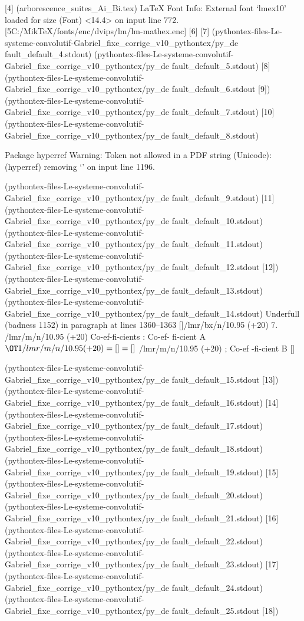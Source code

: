  [4] (arborescence_suites_Ai_Bi.tex)
LaTeX Font Info:    External font `lmex10' loaded for size
(Font)              <14.4> on input line 772.
 [5{C:/MikTeX/fonts/enc/dvips/lm/lm-mathex.enc}] [6] [7]
(pythontex-files-Le-systeme-convolutif-Gabriel_fixe_corrige_v10_pythontex/py_de
fault_default_4.stdout)
(pythontex-files-Le-systeme-convolutif-Gabriel_fixe_corrige_v10_pythontex/py_de
fault_default_5.stdout) [8]
(pythontex-files-Le-systeme-convolutif-Gabriel_fixe_corrige_v10_pythontex/py_de
fault_default_6.stdout [9])
(pythontex-files-Le-systeme-convolutif-Gabriel_fixe_corrige_v10_pythontex/py_de
fault_default_7.stdout) [10]
(pythontex-files-Le-systeme-convolutif-Gabriel_fixe_corrige_v10_pythontex/py_de
fault_default_8.stdout)

Package hyperref Warning: Token not allowed in a PDF string (Unicode):
(hyperref)                removing `\@textsuperscript' on input line 1196.


(pythontex-files-Le-systeme-convolutif-Gabriel_fixe_corrige_v10_pythontex/py_de
fault_default_9.stdout) [11]
(pythontex-files-Le-systeme-convolutif-Gabriel_fixe_corrige_v10_pythontex/py_de
fault_default_10.stdout)
(pythontex-files-Le-systeme-convolutif-Gabriel_fixe_corrige_v10_pythontex/py_de
fault_default_11.stdout)
(pythontex-files-Le-systeme-convolutif-Gabriel_fixe_corrige_v10_pythontex/py_de
fault_default_12.stdout [12])
(pythontex-files-Le-systeme-convolutif-Gabriel_fixe_corrige_v10_pythontex/py_de
fault_default_13.stdout)
(pythontex-files-Le-systeme-convolutif-Gabriel_fixe_corrige_v10_pythontex/py_de
fault_default_14.stdout)
Underfull \hbox (badness 1152) in paragraph at lines 1360--1363
[]/lmr/bx/n/10.95 (+20) 7. /lmr/m/n/10.95 (+20) Co-ef-fi-cients :  Co-ef-
fi-cient A $\OT1/lmr/m/n/10.95 (+20) = [] = []$ /lmr/m/n/10.95 (+20) ; Co-ef
-fi-cient B
 []


(pythontex-files-Le-systeme-convolutif-Gabriel_fixe_corrige_v10_pythontex/py_de
fault_default_15.stdout [13])
(pythontex-files-Le-systeme-convolutif-Gabriel_fixe_corrige_v10_pythontex/py_de
fault_default_16.stdout) [14]
(pythontex-files-Le-systeme-convolutif-Gabriel_fixe_corrige_v10_pythontex/py_de
fault_default_17.stdout)
(pythontex-files-Le-systeme-convolutif-Gabriel_fixe_corrige_v10_pythontex/py_de
fault_default_18.stdout)
(pythontex-files-Le-systeme-convolutif-Gabriel_fixe_corrige_v10_pythontex/py_de
fault_default_19.stdout) [15]
(pythontex-files-Le-systeme-convolutif-Gabriel_fixe_corrige_v10_pythontex/py_de
fault_default_20.stdout)
(pythontex-files-Le-systeme-convolutif-Gabriel_fixe_corrige_v10_pythontex/py_de
fault_default_21.stdout) [16]
(pythontex-files-Le-systeme-convolutif-Gabriel_fixe_corrige_v10_pythontex/py_de
fault_default_22.stdout)
(pythontex-files-Le-systeme-convolutif-Gabriel_fixe_corrige_v10_pythontex/py_de
fault_default_23.stdout) [17]
(pythontex-files-Le-systeme-convolutif-Gabriel_fixe_corrige_v10_pythontex/py_de
fault_default_24.stdout)
(pythontex-files-Le-systeme-convolutif-Gabriel_fixe_corrige_v10_pythontex/py_de
fault_default_25.stdout [18])

